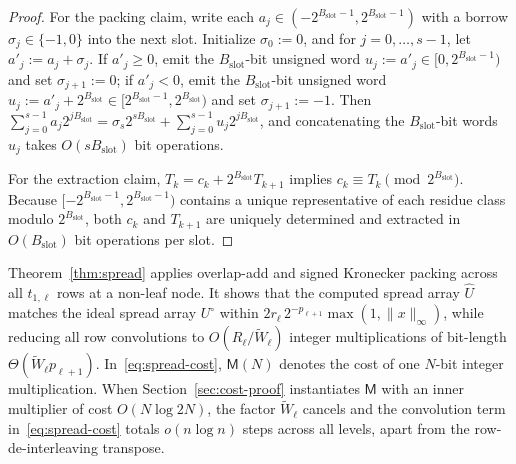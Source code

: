 \begin{proof}
For the packing claim, write each $a_j \in (-2^{B_{\mathrm{slot}}-1}, 2^{B_{\mathrm{slot}}-1})$ with a borrow $\sigma_j \in \{-1, 0\}$ into the next slot. Initialize $\sigma_0 := 0$, and for $j = 0, \dots, s-1$, let $a'_j := a_j + \sigma_j$. If $a'_j \ge 0$, emit the $B_{\mathrm{slot}}$-bit unsigned word $u_j := a'_j \in [0, 2^{B_{\mathrm{slot}}-1})$ and set $\sigma_{j+1} := 0$; if $a'_j < 0$, emit the $B_{\mathrm{slot}}$-bit unsigned word $u_j := a'_j + 2^{B_{\mathrm{slot}}} \in [2^{B_{\mathrm{slot}}-1}, 2^{B_{\mathrm{slot}}})$ and set $\sigma_{j+1} := -1$. Then $\sum_{j=0}^{s-1} a_j 2^{j B_{\mathrm{slot}}} = \sigma_s 2^{s B_{\mathrm{slot}}} + \sum_{j=0}^{s-1} u_j 2^{j B_{\mathrm{slot}}}$, and concatenating the $B_{\mathrm{slot}}$-bit words $u_j$ takes $O(s B_{\mathrm{slot}})$ bit operations.

For the extraction claim, $T_k = c_k + 2^{B_{\mathrm{slot}}} T_{k+1}$ implies $c_k \equiv T_k \pmod{2^{B_{\mathrm{slot}}}}$. Because $[-2^{B_{\mathrm{slot}}-1}, 2^{B_{\mathrm{slot}}-1})$ contains a unique representative of each residue class modulo $2^{B_{\mathrm{slot}}}$, both $c_k$ and $T_{k+1}$ are uniquely determined and extracted in $O(B_{\mathrm{slot}})$ bit operations per slot.
\end{proof}

Theorem~\ref{thm:spread} applies overlap-add and signed Kronecker packing across all $t_{1,\ell}$ rows at a non-leaf node. It shows that the computed spread array $\widehat{U}$ matches the ideal spread array $U^\circ$ within $2 r_\ell \, 2^{-p_{\ell+1}} \max(1, \|x\|_\infty)$, while reducing all row convolutions to $O(R_\ell / \tilde{W}_\ell)$ integer multiplications of bit-length $\Theta(\tilde{W}_\ell p_{\ell+1})$. In~\eqref{eq:spread-cost}, $\mathsf{M}(N)$ denotes the cost of one $N$-bit integer multiplication. When Section~\ref{sec:cost-proof} instantiates $\mathsf{M}$ with an inner multiplier of cost $O(N \log 2N)$, the factor $\tilde{W}_\ell$ cancels and the convolution term in~\eqref{eq:spread-cost} totals $o(n \log n)$ steps across all levels, apart from the row-de-interleaving transpose.

